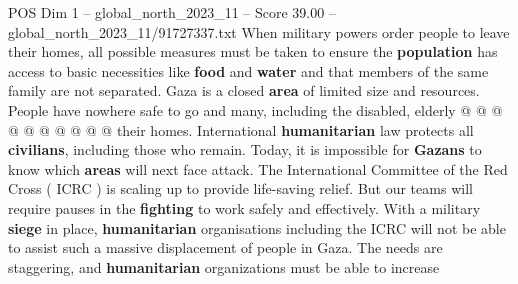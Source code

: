 \begin{textsample}{POS Dim 1 – global\_north\_2023\_11 – Score 39.00 – global\_north\_2023\_11/91727337.txt}
When military powers order people to leave their homes, all possible measures must be taken to ensure the \textbf{population} has access to basic necessities like \textbf{food} and \textbf{water} and that members of the same family are not separated.
Gaza is a closed \textbf{area} of limited size and resources.
People have nowhere safe to go and many, including the disabled, elderly @ @ @ @ @ @ @ @ @ @ their homes.
International \textbf{humanitarian} law protects all \textbf{civilians}, including those who remain.
Today, it is impossible for \textbf{Gazans} to know which \textbf{areas} will next face attack.
The International Committee of the Red Cross ( ICRC ) is scaling up to provide life-saving relief.
But our teams will require pauses in the \textbf{fighting} to work safely and effectively.
With a military \textbf{siege} in place, \textbf{humanitarian} organisations including the ICRC will not be able to assist such a massive displacement of people in Gaza.
The needs are staggering, and \textbf{humanitarian} organizations must be able to increase

\end{textsample}
